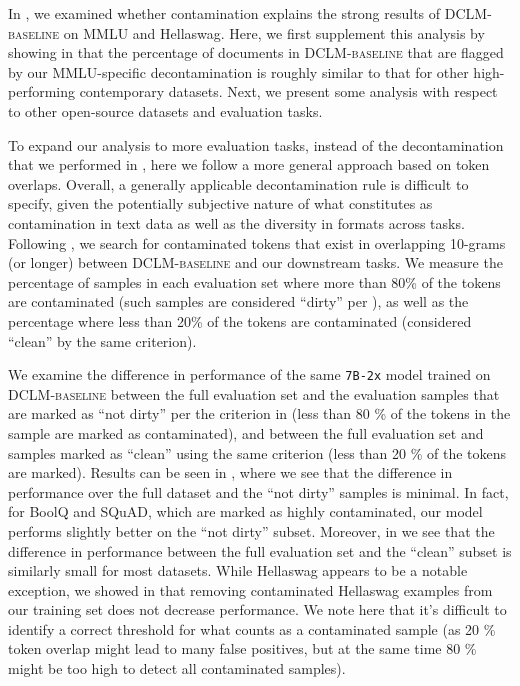 \documentclass{article}
\newcommand{\hqpool}{\textsc{DCLM-baseline}\xspace}
\newcommand{\xltrack}{\texttt{7B-2x}\xspace}
\begin{document}


In , we examined whether contamination explains the strong results of \hqpool on MMLU and Hellaswag. Here, we first supplement this analysis by showing in  that the percentage of documents in \hqpool that are flagged by our MMLU-specific decontamination is roughly similar to that for other high-performing contemporary datasets. Next, we present some analysis with respect to other open-source datasets and evaluation tasks.

To expand our analysis to more evaluation tasks, instead of the decontamination that we performed in , here we follow a more general approach based on token overlaps. Overall, a generally applicable decontamination rule is difficult to specify, given the potentially subjective nature of what constitutes as contamination in text data as well as the diversity in formats across tasks. Following \citet{llama2}, we search for contaminated tokens that exist in overlapping 10-grams (or longer) between \hqpool and our downstream tasks. We measure the percentage of samples in each evaluation set where more than 80\% of the tokens are contaminated (such samples are considered ``dirty'' per \citet{llama2}), as well as the percentage where less than 20\% of the tokens are contaminated (considered ``clean'' by the same criterion).

We examine the difference in performance of the same \xltrack model trained on \hqpool between the full evaluation set and the evaluation samples that are marked as ``not dirty'' per the criterion in \citet{llama2} (less than 80 \% of the tokens in the sample are marked as contaminated), and between the full evaluation set and samples marked as ``clean'' using the same criterion (less than 20 \% of the tokens are marked).
Results can be seen in , where we see that the difference in performance over the full dataset and the ``not dirty'' samples is minimal.
In fact, for BoolQ and SQuAD, which are marked as highly contaminated, our model performs slightly better on the ``not dirty'' subset.
Moreover, in  we see that the difference in performance between the full evaluation set and the ``clean'' subset is similarly small for most datasets. While Hellaswag appears to be a notable exception, we showed in  that removing contaminated Hellaswag examples from our training set does not decrease performance.
We note here that it's difficult to identify a correct threshold for what counts as a contaminated sample (as 20 \% token overlap might lead to many false positives, but at the same time 80 \% might be too high to detect all contaminated samples).
\end{document}
